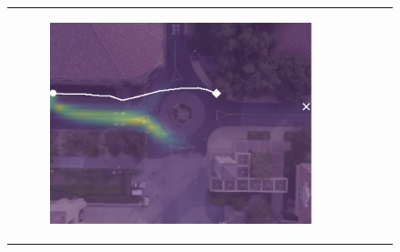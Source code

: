 \documentclass[letterpaper,10pt,conference]{ieeeconf}
\begin{document}
\begin{figure}
\begin{tabular}{M{.1\linewidth}  M{.3\linewidth} M{.3\linewidth}  M{.3\linewidth}}
\begin{subfigure}[b]{\linewidth}
		\includegraphics[width=\linewidth]{./figures/comparison/kit_death_1_2_t=370.png}
	\end{subfigure} \\
	

\end{tabular}
\end{figure}
\end{document}

